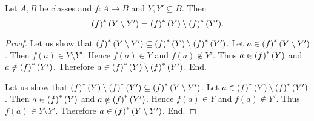 \documentclass[../../set-theory/set-theory.tex]{subfiles}
\begin{document}
  \begin{forthel}
    \begin{proposition}
      Let $A, B$ be classes and $f : A \to B$ and $Y, Y' \subseteq B$.
      Then \[ \left(f\right)^{*}(Y \setminus Y') = \left(f\right)^{*}(Y) \setminus \left(f\right)^{*}(Y'). \]
    \end{proposition}
    \begin{proof}
      Let us show that $\left(f\right)^{*}(Y \setminus Y') \subseteq
      \left(f\right)^{*}(Y) \setminus \left(f\right)^{*}(Y')$.
        Let $a \in \left(f\right)^{*}(Y \setminus Y')$.
        Then $f(a) \in Y \setminus Y'$.
        Hence $f(a) \in Y$ and $f(a) \notin Y'$.
        Thus $a \in \left(f\right)^{*}(Y)$ and $a \notin \left(f\right)^{*}(Y')$.
        Therefore $a \in \left(f\right)^{*}(Y) \setminus \left(f\right)^{*}(Y')$.
      End.

      Let us show that $\left(f\right)^{*}(Y) \setminus \left(f\right)^{*}(Y') \subseteq
      \left(f\right)^{*}(Y \setminus Y')$.
        Let $a \in \left(f\right)^{*}(Y) \setminus \left(f\right)^{*}(Y')$.
        Then $a \in \left(f\right)^{*}(Y)$ and $a \notin \left(f\right)^{*}(Y')$.
        Hence $f(a) \in Y$ and $f(a) \notin Y'$.
        Thus $f(a) \in Y \setminus Y'$.
        Therefore $a \in \left(f\right)^{*}(Y \setminus Y')$.
      End.
    \end{proof}
  \end{forthel}
\end{document}
